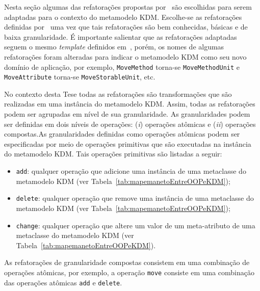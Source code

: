 Nesta seção algumas das refatorações propostas por~ são escolhidas para serem adaptadas para o contexto do metamodelo KDM. Escolhe-se as refatorações definidas por~ uma vez que tais refatorações são bem conhecidas, básicas e de baixa granularidade. É importante salientar que as refatorações adaptadas seguem o mesmo \textit{template} definidos em~, porém, os nomes de algumas refatorações foram alteradas para indicar o metamodelo KDM como seu novo domínio de aplicação, por exemplo, \texttt{MoveMethod} torna-se \texttt{MoveMethodUnit} e \texttt{MoveAttribute} torna-se \texttt{MoveStorableUnit}, etc. 

No contexto desta Tese todas as refatorações são transformações que são realizadas em uma instância do metamodelo KDM. Assim, todas as refatorações podem ser agrupadas em nível de sua granularidade. As granularidades podem ser definidas em dois níveis de operações: (\textit{i}) operações atômicas e (\textit{ii}) operações compostas.As granularidades definidas como operações atômicas podem ser especificadas por meio de operações primitivas que são executadas na instância do metamodelo KDM. Tais operações primitivas são listadas a seguir:

\begin{itemize}
\item \texttt{add}: qualquer operação que adicione uma instância de uma metaclasse do metamodelo KDM (ver Tabela~\ref{tab:mapemanetoEntreOOPeKDM});
\item \texttt{delete}: qualquer operação que remove uma instância de uma metaclasse do metamodelo KDM (ver Tabela~\ref{tab:mapemanetoEntreOOPeKDM});
\item \texttt{change}: qualquer operação que altere um valor de um meta-atributo de uma metaclasse do metamodelo KDM (ver Tabela~\ref{tab:mapemanetoEntreOOPeKDM}).
\end{itemize}

As refatorações de granularidade compostas consistem em uma combinação de operações atômicas, por exemplo, a operação \texttt{move} consiste em uma combinação das operações atômicas \texttt{add} e \texttt{delete}.


